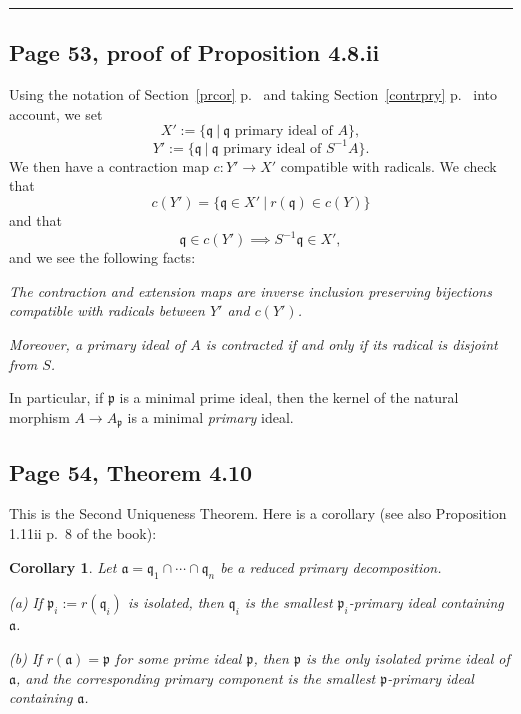 \documentclass[parskip=half,fontsize=12pt]{scrartcl}%
\newcommand{\mf}{\mathfrak}
\newcommand{\aaa}{\mf a}
\newcommand{\ppp}{\mf p}
\newcommand{\qqq}{\mf q}
\newtheorem{cor}[thm]{Corollary}
\begin{document}
\hrule\bigskip

\subsection{Page 53, proof of Proposition 4.8.ii}\label{prycor}%

Using the notation of Section~\ref{prcor} p.~\pageref{prcor} and taking Section~\ref{contrpry} p.~\pageref{contrpry} into account, we set 
$$
X':=\{\qqq\ |\ \qqq\text{ primary ideal of }A\},
$$ 
$$
Y':=\{\qqq\ |\ \qqq\text{ primary ideal of }S^{-1}A\}.
$$ 
We then have a contraction map $c:Y'\to X'$ compatible with radicals. We check that  
$$
c(Y')=\{\qqq\in X'\ |\ r(\qqq)\in c(Y)\}
$$ 
and that 
$$
\qqq\in c(Y')\implies S^{-1}\qqq\in X',
$$ 
and we see the following facts: 

\emph{The contraction and extension maps are inverse inclusion preserving bijections compatible with radicals between $Y'$ and $c(Y')$.} 

\emph{Moreover, a primary ideal of $A$ is contracted if and only if its radical is disjoint from $S$.}

In particular, if $\ppp$ is a minimal prime ideal, then the kernel of the natural morphism $A\to A_\ppp$ is a minimal \emph{primary} ideal.


\subsection{Page 54, Theorem 4.10}%

This is the Second Uniqueness Theorem. Here is a corollary (see also Proposition 1.11ii p.~8 of the book):

\begin{cor}\label{410}
Let $\aaa=\qqq_1\cap\cdots\cap\qqq_n$ be a reduced primary decomposition.

(a) If $\ppp_i:=r(\qqq_i)$ is isolated, then $\qqq_i$ is the smallest $\ppp_i$-primary ideal containing $\aaa$.%

(b) If $r(\aaa)=\ppp$ for some prime ideal $\ppp$, then $\ppp$ is the only isolated prime ideal of $\aaa$, and the corresponding primary component is the smallest $\ppp$-primary ideal containing $\aaa$.
\end{cor}
\end{document}
